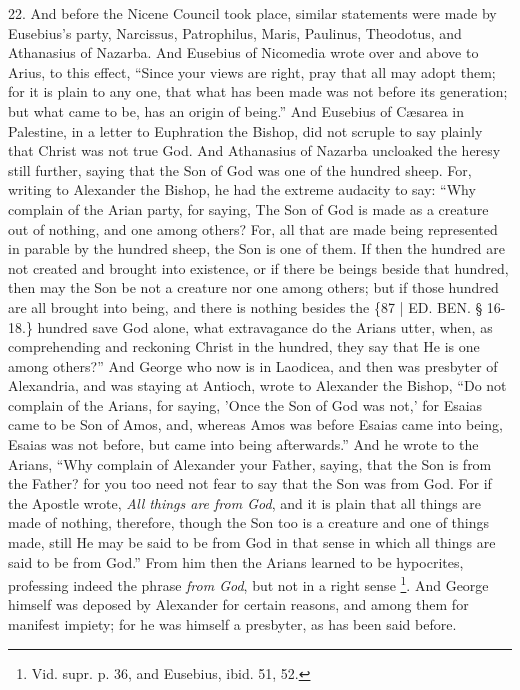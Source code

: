 22. And before the Nicene
Council took place, similar statements were made by Eusebius's party,
Narcissus, Patrophilus, Maris, Paulinus, Theodotus, and Athanasius of
Nazarba. And Eusebius of Nicomedia wrote over and above to Arius, to
this effect, ``Since your views are right, pray that all may adopt
them; for it is plain to any one, that what has been made was not
before its generation; but what came to be, has an origin of being.''
And Eusebius of Cæsarea in Palestine, in a letter to Euphration the
Bishop, did not scruple to say plainly that Christ was not true God.
And Athanasius of Nazarba uncloaked the heresy still further, saying
that the Son of God was one of the hundred sheep. For, writing to
Alexander the Bishop, he had the extreme audacity to say: ``Why
complain of the Arian party, for saying, The Son of God is made as a
creature out of nothing, and one among others? For, all that are made
being represented in parable by the hundred sheep, the Son is one of
them. If then the hundred are not created and brought into existence,
or if there be beings beside that hundred, then may the Son be not a
creature nor one among others; but if those hundred are all brought
into being, and there is nothing besides the \{87 | ED.
BEN.
§ 16-18.\} hundred save God alone, what extravagance do the Arians
utter, when, as comprehending and reckoning Christ in the hundred,
they say that He is one among others?'' And George who now is in
Laodicea, and then was presbyter of Alexandria, and was staying at
Antioch, wrote to Alexander the Bishop, ``Do not complain of the
Arians, for saying, 'Once the Son of God was not,' for Esaias came to
be Son of Amos, and, whereas Amos was before Esaias came into being,
Esaias was not before, but came into being afterwards.'' And he wrote
to the Arians, ``Why complain of Alexander your Father, saying, that
the Son is from the Father? for you too need not fear to say that the
Son was from God. For if the Apostle wrote, \emph{All} \emph{things are
from God}, and it is plain that all things are made of nothing,
therefore, though the Son too is a creature and one of things made,
still He may be said to be from God in that sense in which all things
are said to be from God.'' From him then the Arians learned to be
hypocrites, professing indeed the phrase \emph{from God}, but not in a
right sense \footnote{Vid. supr. p. 36, and Eusebius, ibid. 51, 52.}. And
George himself was deposed by Alexander for certain reasons, and among
them for manifest impiety; for he was himself a presbyter, as has been
said before.

